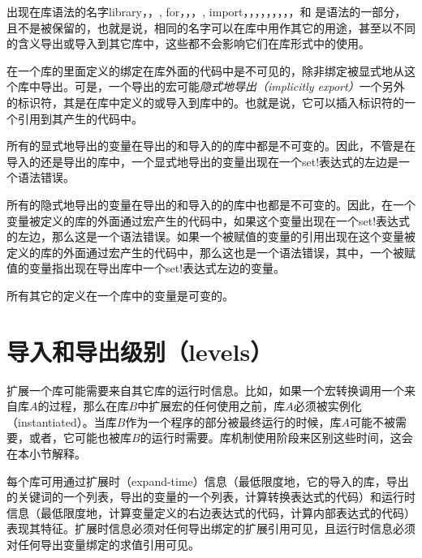 \begin{note}
出现在库语法的名字{\cf library}，，,
{\cf for}，，，,
{\cf import}，，，，，，，，，\allowbreak{}{\cf >=}\allowbreak{}和\allowbreak{}{\cf <=}\allowbreak{}
是语法的一部分，且不是被保留的，也就是说，相同的名字可以在库中用作其它的用途，甚至以不同的含义导出或导入到其它库中，这些都不会影响它们在{\cf 库}形式中的使用。
\end{note}

在一个库的里面定义的绑定在库外面的代码中是不可见的，除非绑定被显式地从这个库中导出。可是，一个导出的宏可能\emph{隐式地导出（implicitly export）}一个另外的标识符，其是在库中定义的或导入到库中的。也就是说，它可以插入标识符的一个引用到其产生的代码中。

\label{importsareimmutablesection}
所有的显式地导出的变量在导出的和导入的的库中都是不可变的。因此，不管是在导入的还是导出的库中，一个显式地导出的变量出现在一个{\cf set!}表达式的左边是一个语法错误。

所有的隐式地导出的变量在导出的和导入的的库中也都是不可变的。因此，在一个变量被定义的库的外面通过宏产生的代码中，如果这个变量出现在一个{\cf set!}表达式的左边，那么这是一个语法错误。如果一个被赋值的变量的引用出现在这个变量被定义的库的外面通过宏产生的代码中，那么这也是一个语法错误，其中，一个被赋值的变量指出现在导出库中一个{\cf set!}表达式左边的变量。

所有其它的定义在一个库中的变量是可变的。

\section{导入和导出级别（levels）}
\label{phasessection}

扩展一个库可能需要来自其它库的运行时信息。比如，如果一个宏转换调用一个来自库$A$的过程，那么在库$B$中扩展宏的任何使用之前，库$A$必须被实例化（instantiated）。当库$B$作为一个程序的部分被最终运行的时候，库$A$可能不被需要，或者，它可能也被库$B$的运行时需要。库机制使用阶段来区别这些时间，这会在本小节解释。

每个库可用通过扩展时（expand-time）信息（最低限度地，它的导入的库，导出的关键词的一个列表，导出的变量的一个列表，计算转换表达式的代码）和运行时信息（最低限度地，计算变量定义的右边表达式的代码，计算内部表达式的代码）表现其特征。扩展时信息必须对任何导出绑定的扩展引用可见，且运行时信息必须对任何导出变量绑定的求值引用可见。

